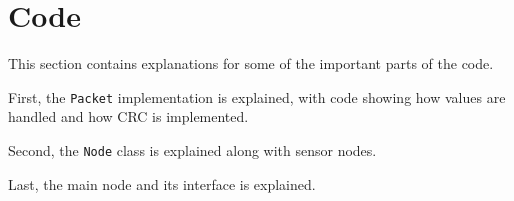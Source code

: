 \section{Code}
This section contains explanations for some of the important parts of the code.

First, the \texttt{Packet} implementation is explained, with code showing how values are handled and how CRC is implemented.

Second, the \texttt{Node} class is explained along with sensor nodes.

Last, the main node and its interface is explained.



